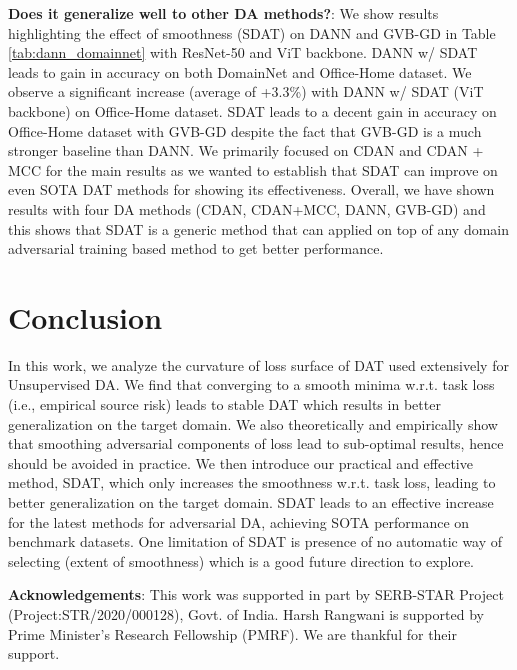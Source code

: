\documentclass[table,dvipsnames]{article}
\theoremstyle{plain}
\theoremstyle{definition}
\theoremstyle{remark}
\begin{document}
\textbf{Does it generalize well to other DA methods?}: We show results highlighting the effect of smoothness (SDAT) on DANN\cite{ganin2016domain} and GVB-GD \cite{cui2020gvb} in Table \ref{tab:dann_domainnet} with ResNet-50 and ViT backbone. DANN w/ SDAT leads to gain in accuracy on both DomainNet and Office-Home dataset. We observe a significant increase (average of +3.3\%) with DANN w/ SDAT (ViT backbone) on Office-Home dataset. SDAT leads to a decent gain in accuracy on Office-Home dataset with GVB-GD despite the fact that GVB-GD is a much stronger baseline than DANN. We primarily focused on CDAN and CDAN + MCC for the main results as we wanted to establish that SDAT can improve on even SOTA DAT methods for showing its effectiveness. Overall, we have shown results with four DA methods (CDAN, CDAN+MCC, DANN, GVB-GD) and this shows that SDAT is a generic method that can applied on top of any domain adversarial training based method to get better performance.








\section{Conclusion}
In this work, we analyze the curvature of loss surface of DAT used extensively for Unsupervised DA. We find that converging to a smooth minima w.r.t. {task} loss (i.e., empirical source risk) leads to stable DAT which results in better generalization on the target domain. We also theoretically and empirically show that smoothing adversarial components of loss lead to sub-optimal results, hence should be avoided in practice. We then introduce our practical and effective method, SDAT, which only increases the smoothness w.r.t. {task} loss, leading to better generalization on the target domain. SDAT leads to an effective increase for the latest methods for adversarial DA, achieving SOTA performance on benchmark datasets. One limitation of SDAT is presence of no automatic way of selecting  (extent of smoothness) which is a good future direction to explore. 

\textbf{Acknowledgements}: This work was supported in part by  SERB-STAR Project (Project:STR/2020/000128), Govt. of India. Harsh Rangwani is supported by Prime Minister's Research Fellowship (PMRF). We are thankful for their support.





\end{document}

